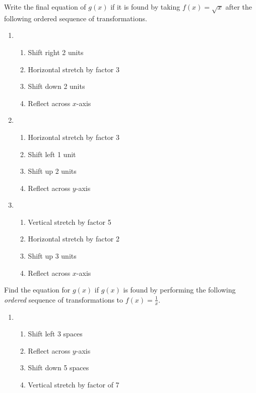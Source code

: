 \newpage

Write the final equation of $g(x)$ if it is found by taking $f(x) = \sqrt{x}$ after the following ordered sequence of transformations.   

\begin{enumerate}	\setcounter{enumi}{\value{Review}}
\item \begin{enumerate}[(1)]
\setlength\itemsep{0pt}
    \item Shift right 2 units
    \item Horizontal stretch by factor 3
    \item Shift down 2 units
    \item Reflect across $x$-axis
\end{enumerate}

\item
\begin{enumerate}[(1)]
\setlength\itemsep{0pt}
    \item Horizontal stretch by factor 3
    \item Shift left 1 unit
    \item Shift up 2 units
    \item Reflect across $y$-axis
\end{enumerate}

\item
\begin{enumerate}[(1)]
\setlength\itemsep{0pt}
    \item Vertical stretch by factor 5
    \item Horizontal stretch by factor 2
    \item Shift up 3 units
    \item Reflect across $x$-axis
\end{enumerate}
\setcounter{Review}{\value{enumi}}
\end{enumerate}

Find the equation for $g(x)$ if $g(x)$ is found by performing the following \emph{ordered} sequence of transformations to $f(x)=\frac{1}{x}$.

\begin{enumerate}	\setcounter{enumi}{\value{Review}}
\item \begin{enumerate}[(1)]
\setlength\itemsep{0pt}
	\item Shift left 3 spaces
	\item Reflect across $y$-axis
	\item Shift down 5 spaces
	\item Vertical stretch by factor of 7
\end{enumerate}
\setcounter{Review}{\value{enumi}}
\end{enumerate}

